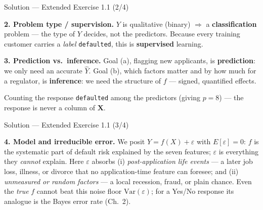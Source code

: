 \documentclass[aspectratio=169,11pt]{beamer}
\begin{document}
\begin{frame}{Solution --- Extended Exercise 1.1 (2/4)}
\begin{solutionbox}
\textbf{2. Problem type / supervision.} $Y$ is qualitative (binary) $\Rightarrow$ a \textbf{classification} problem --- the type of $Y$ decides, not the predictors. Because every training customer carries a \emph{label} \texttt{defaulted}, this is \textbf{supervised} learning.

\textbf{3. Prediction vs.\ inference.} Goal (a), flagging new applicants, is \textbf{prediction}: we only need an accurate $\hat Y$. Goal (b), which factors matter and by how much for a regulator, is \textbf{inference}: we need the structure of $f$ --- signed, quantified effects.
\end{solutionbox}
\begin{mistake}
Counting the response \texttt{defaulted} among the predictors (giving $p=8$) --- the response is never a column of $\mathbf X$.
\end{mistake}
\end{frame}

\begin{frame}{Solution --- Extended Exercise 1.1 (3/4)}
\begin{solutionbox}
\textbf{4. Model and irreducible error.} We posit $Y=f(X)+\varepsilon$ with $E[\varepsilon]=0$: $f$ is the systematic part of default risk explained by the seven features; $\varepsilon$ is everything they \emph{cannot} explain. Here $\varepsilon$ absorbs (i) \emph{post-application life events} --- a later job loss, illness, or divorce that no application-time feature can foresee; and (ii) \emph{unmeasured or random factors} --- a local recession, fraud, or plain chance. Even the \emph{true} $f$ cannot beat this noise floor $\mathrm{Var}(\varepsilon)$; for a Yes/No response its analogue is the Bayes error rate (Ch.~2).
\end{solutionbox}
\end{frame}
\end{document}
